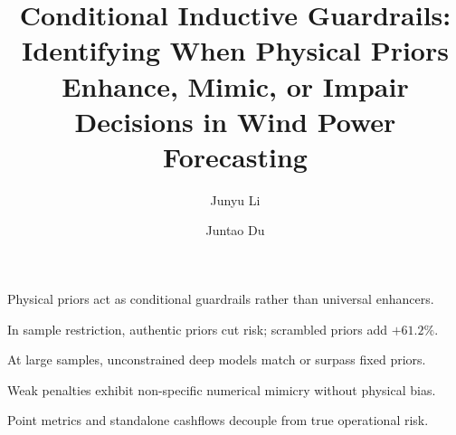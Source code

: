 \documentclass[3p,twocolumn,times]{elsarticle}
\theoremstyle{definition}
\theoremstyle{remark}
\begin{document}
\begin{frontmatter}

\title{Conditional Inductive Guardrails: Identifying When Physical Priors Enhance, Mimic, or Impair Decisions in Wind Power Forecasting}

\author[1]{Junyu Li}
\author[1]{Juntao Du}

\address[1]{School of Statistics and Applied Mathematics, Anhui University of Finance and Economics, Bengbu 233030, China}


\begin{highlights}
\item Physical priors act as conditional guardrails rather than universal enhancers.
\item In sample restriction, authentic priors cut risk; scrambled priors add $+61.2\%$.
\item At large samples, unconstrained deep models match or surpass fixed priors.
\item Weak penalties exhibit non-specific numerical mimicry without physical bias.
\item Point metrics and standalone cashflows decouple from true operational risk.
\end{highlights}


\end{frontmatter}
\end{document}
